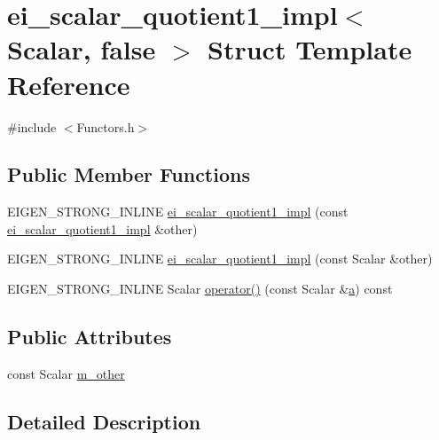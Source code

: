 \hypertarget{structei__scalar__quotient1__impl_3_01_scalar_00_01false_01_4}{\section{ei\-\_\-scalar\-\_\-quotient1\-\_\-impl$<$ Scalar, false $>$ Struct Template Reference}
\label{structei__scalar__quotient1__impl_3_01_scalar_00_01false_01_4}
}


{\ttfamily \#include $<$Functors.\-h$>$}

\subsection*{Public Member Functions}
\begin{DoxyCompactItemize}
\item 
E\-I\-G\-E\-N\-\_\-\-S\-T\-R\-O\-N\-G\-\_\-\-I\-N\-L\-I\-N\-E \hyperlink{structei__scalar__quotient1__impl_3_01_scalar_00_01false_01_4_a7046202d0baea5df4bcc5aad92f9a2e9}{ei\-\_\-scalar\-\_\-quotient1\-\_\-impl} (const \hyperlink{structei__scalar__quotient1__impl}{ei\-\_\-scalar\-\_\-quotient1\-\_\-impl} \&other)
\item 
E\-I\-G\-E\-N\-\_\-\-S\-T\-R\-O\-N\-G\-\_\-\-I\-N\-L\-I\-N\-E \hyperlink{structei__scalar__quotient1__impl_3_01_scalar_00_01false_01_4_a00124c98683ffef41d6bb559e4250eb9}{ei\-\_\-scalar\-\_\-quotient1\-\_\-impl} (const Scalar \&other)
\item 
E\-I\-G\-E\-N\-\_\-\-S\-T\-R\-O\-N\-G\-\_\-\-I\-N\-L\-I\-N\-E Scalar \hyperlink{structei__scalar__quotient1__impl_3_01_scalar_00_01false_01_4_a8ea41849d39458276f88f6e8b7260186}{operator()} (const Scalar \&\hyperlink{glext_8h_ac8729153468b5dcf13f971b21d84d4e5}{a}) const 
\end{DoxyCompactItemize}
\subsection*{Public Attributes}
\begin{DoxyCompactItemize}
\item 
const Scalar \hyperlink{structei__scalar__quotient1__impl_3_01_scalar_00_01false_01_4_a1ca9e7a1249ab8b43bd691099080beb5}{m\-\_\-other}
\end{DoxyCompactItemize}


\subsection{Detailed Description}
